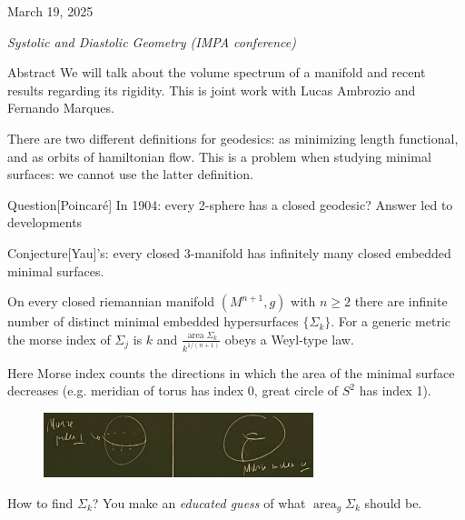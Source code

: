 \hfill{\large March 19, 2025

\hfill \textit{Systolic and Diastolic Geometry (IMPA conference)}}
\vspace{2em}

\begin{thing6}{Abstract}
We will talk about the volume spectrum of a manifold and recent results regarding its rigidity. This is joint work with Lucas Ambrozio and Fernando Marques.
\end{thing6}
\vspace{2em}

There are two different definitions for geodesics: as minimizing length functional, and as orbits of hamiltonian flow. This is a problem when studying minimal surfaces: we cannot use the latter definition.

\begin{thing7}{Question}[Poincaré]\leavevmode
In 1904: every 2-sphere has a closed geodesic? Answer led to developments
\end{thing7}

\begin{thing4}{Conjecture}[Yau]'s: every closed 3-manifold has infinitely many closed embedded minimal surfaces.
\end{thing4}

\begin{thm}\leavevmode
On every closed riemannian manifold \((M^{n+1},g)\) with \(n \geq 2\) there are infinite number of distinct minimal embedded hypersurfaces \(\{\Sigma_k\}\). For a generic metric the morse index of \(\Sigma_j\) is \(k\) and \(\frac{ \operatorname{area} \Sigma_k}{k^{1/(n+1)}}\) obeys a Weyl-type law.
\end{thm}

\begin{remark}\leavevmode
Here Morse index counts the directions in which the area of the minimal surface decreases (e.g. meridian of torus has index 0, great circle of \(S^2\) has index 1).
\begin{figure}[H]
	\centering
	\includegraphics[width=0.7\textwidth]{systolic2}
\end{figure}
\end{remark}

How to find \(\Sigma_k\)? You make an \textit{educated guess} of what \(\operatorname{area}_g\Sigma_k\) should be.

